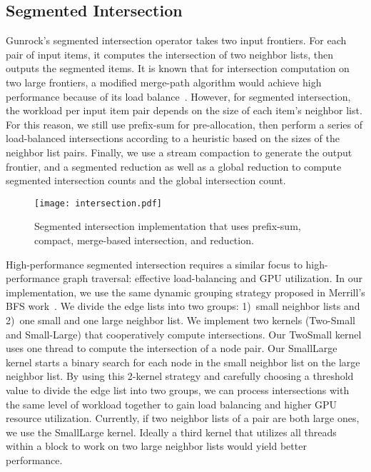 \documentclass[format=acmsmall,review=false,screen=true]{acmart}
\begin{document}
\subsection{Segmented Intersection}
Gunrock's segmented intersection operator takes two input frontiers.
For each pair of input items, it computes the intersection of two
neighbor lists, then outputs the segmented items. It is known that for
intersection computation on two large frontiers, a modified merge-path
algorithm would achieve high performance because of its load
balance~\cite{Baxter:2013:MGM}. However, for segmented intersection,
the workload per input item pair depends on the size of each item's
neighbor list. For this reason, we still use prefix-sum for
pre-allocation, then perform a series of load-balanced intersections
according to a heuristic based on the sizes of the neighbor list
pairs. Finally, we use a stream compaction to generate the output
frontier, and a segmented reduction as well as a global reduction to
compute segmented intersection counts and the global intersection
count.

\begin{figure}
  \centering
  \texttt{[image: intersection.pdf]}
  \centering
  \caption[Workflow of segmented intersection operator.]{Segmented
    intersection implementation that uses prefix-sum, compact,
    merge-based intersection, and reduction.}
  \label{fig:intersection}
\end{figure}

High-performance segmented intersection requires a similar focus to
high-performance graph traversal: effective load-balancing and GPU
utilization. In our implementation, we use the same dynamic grouping
strategy proposed in Merrill's BFS work~\cite{Merrill:2012:SGG}. We
divide the edge lists into two groups: 1)~small neighbor lists and
2)~one small and one large neighbor list. We implement two kernels
(Two-Small and Small-Large) that cooperatively compute intersections.
Our TwoSmall kernel uses one thread to compute the intersection of a
node pair. Our SmallLarge kernel starts a binary search for each node
in the small neighbor list on the large neighbor list. By using this
2-kernel strategy and carefully choosing a threshold value to divide
the edge list into two groups, we can process intersections with the
same level of workload together to gain load balancing and higher GPU
resource utilization. Currently, if two neighbor lists of a pair are
both large ones, we use the SmallLarge kernel. Ideally a third kernel
that utilizes all threads within a block to work on two large neighbor
lists would yield better performance.
\end{document}
